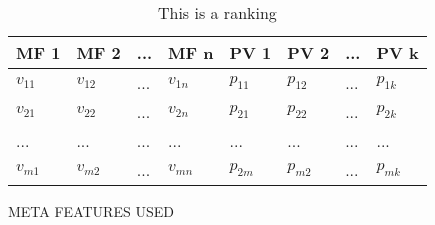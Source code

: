 \begin{table}[h]
\centering
	\begin{tabularx}{\textwidth}{X | X | X | X | X | X | X | X}
		MF 1				& MF 2				& ... 	& MF n				& PV 1 		& PV 2 		&	...	&	PV k 		\\ \hline
		$v_{11}$			& $v_{12}$			& ...	& $v_{1n}$			& $p_{11}$	& $p_{12}$	& 	...	&	$p_{1k}$		\\ \hline
		$v_{21}$			& $v_{22}$			& ...	& $v_{2n}$			& $p_{21}$	& $p_{22}$	& 	...	&	$p_{2k}$		\\ \hline
		...				& ...				& ...	& ...				& ...		& ...		&	...	&	...			\\ \hline
		$v_{m1}$			& $v_{m2}$			& ... 	& $v_{mn}$			& $p_{2m}$	& $p_{m2}$	& 	...	&	$p_{mk}$			 
	\end{tabularx}
	\label{tab:table1}
	\caption{This is a ranking}
\end{table}

META FEATURES USED
